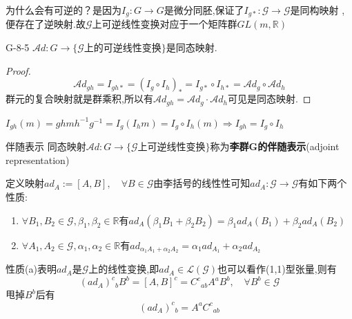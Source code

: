\documentclass[../main.tex]{subfiles}
\begin{document}
为什么会有可逆的？是因为$I_g:G\rightarrow G$是微分同胚,保证了$I_{g*}:\mathscr{G}\rightarrow \mathscr{G}$是同构映射
,便存在了逆映射.故{$\mathscr{G}$上可逆线性变换}对应于一个矩阵群$GL(m,\mathbb{R})$
\begin{theorem}{}{G-8-5}
	$\mathscr{A}\!d:G \rightarrow \{\mathscr{G}\text{上的可逆线性变换}\}$是同态映射.
\end{theorem}
\begin{proof}
	$$\mathscr{A}\!d_{gh} = I_{gh*} =(I_{g}\circ I_{h})_* =I_{g*} \circ I_{h*}= \mathscr{A}\!d_g \circ \mathscr{A}\!d_h$$
	群元的复合映射就是群乘积,所以有$\mathscr{A}\!d_{gh} = \mathscr{A}\!d_g\cdot \mathscr{A}\!d_h$可见是同态映射.
\end{proof}
\begin{note}
	$I_{gh}(m) =ghmh^{-1}g^{-1} = I_{g}(I_h{m}) = I_{g}\circ I_{h} (m) \Rightarrow I_{gh} = I_g\circ I_h$
\end{note}
\begin{definition}{}{伴随表示}
	同态映射$\mathscr{A}\!d:G \rightarrow \{\mathscr{G}\text{上可逆线性变换}\}$称为\textbf{李群G的伴随表示}(adjoint representation)
\end{definition}

定义映射$ad_A:=[A,B],\quad \forall B \in \mathscr{G}$由李括号的线性性可知$ad_A:\mathscr{G}\rightarrow \mathscr{G}$有如下两个性质:
\begin{enumerate}[label = (\alph*).]
	\item $\forall B_1,B_2\in \mathscr{G},\beta_1,\beta_2 \in \mathbb{R}$有$ad_A(\beta_1 B_1 +\beta_2B_2) = \beta_1 ad_A(B_1) + \beta_2 ad_A(B_2)$
	\item $\forall A_1,A_2\in \mathscr{G},\alpha_1,\alpha_2 \in \mathbb{R}$有$ad_{\alpha_1A_1 + \alpha_2 A_2}=\alpha_1 ad_{A_1} + \alpha_2 ad_{A_2}$
\end{enumerate}
性质(a)表明$ad_A$是$\mathscr{G}$上的线性变换,即$ad_A \in \mathscr{L}(\mathscr{G})$也可以看作(1,1)型张量,则有
$$
	(ad_A)^c{}_bB^b = [A,B]^c = C^c{}_{ab}A^aB^b,\quad \forall B^b \in \mathscr{G}$$
甩掉$B^b$后有$$
	(ad_A)^c{}_b = A^aC^c{}_{ab}
$$
\end{document}
